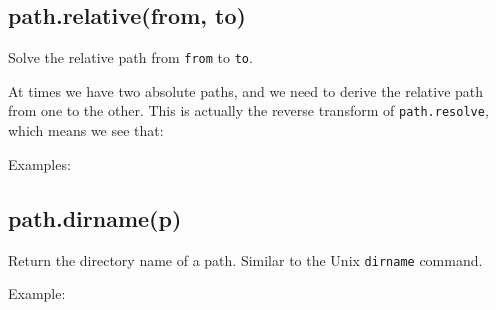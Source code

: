 \subsection{path.relative(from, to)}

Solve the relative path from \texttt{from} to \texttt{to}.

At times we have two absolute paths, and we need to derive the relative
path from one to the other. This is actually the reverse transform of
\texttt{path.resolve}, which means we see that:

\begin{Shaded}
\begin{Highlighting}[]
\end{Highlighting}
\end{Shaded}

Examples:

\begin{Shaded}
\begin{Highlighting}[]
\NormalTok{(}\NormalTok{, }\NormalTok{)}

\NormalTok{(}\NormalTok{, }\NormalTok{)}
\end{Highlighting}
\end{Shaded}

\subsection{path.dirname(p)}

Return the directory name of a path. Similar to the Unix
\texttt{dirname} command.

Example:

\begin{Shaded}
\begin{Highlighting}[]
\NormalTok{(}\NormalTok{)}
\end{Highlighting}
\end{Shaded}

